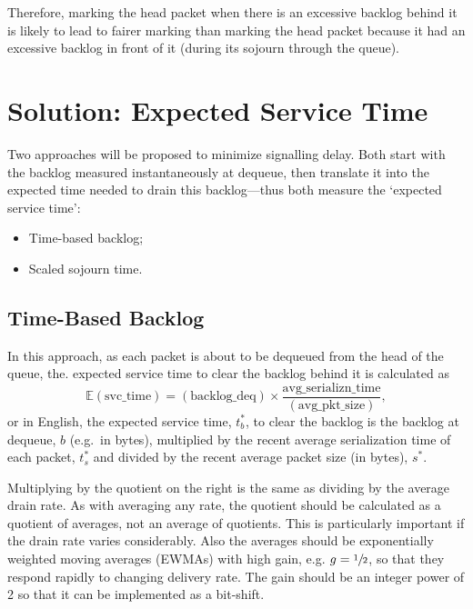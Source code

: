 Therefore, marking the head packet when there is an excessive backlog behind it is likely to lead to fairer marking than marking the head packet because it had an excessive backlog in front of it (during its sojourn through the queue). 

\section{Solution: Expected Service Time}\label{sec:exp_svc_time}

Two approaches will be proposed to minimize signalling delay. Both start with the backlog measured instantaneously at dequeue, then translate it into the expected time needed to drain this backlog---thus both measure the `expected service time':
\begin{itemize}[nosep]
	\item Time-based backlog;
	\item Scaled sojourn time.
\end{itemize}

\subsection{Time-Based Backlog}\label{sec:time-based_backlog}

In this approach, as each packet is about to be dequeued from the head of the queue, the. expected service time to clear the backlog behind it is calculated as
\[\mathbb{E}(\mathrm{svc\_time}) = \mathrm{(backlog\_deq)}\times \frac{\mathrm{avg\_serializn\_time}}{\mathrm{(avg\_pkt\_size)}},\]
or in English, the expected service time, \(t_b^*\), to clear the backlog is the backlog at dequeue, \(b\) (e.g.\ in bytes), multiplied by the recent average serialization time of each packet, \(t_s^*\) and divided by the recent average packet size (in bytes), \(s^*\).

Multiplying by the quotient on the right is the same as dividing by the average drain rate. As with averaging any rate, the quotient should be calculated as a quotient of averages, not an average of quotients. This is particularly important if the drain rate varies considerably. Also the averages should be exponentially weighted moving averages (EWMAs) with high gain, e.g. \(g=\sfrac{1}{2}\), so that they respond rapidly to changing delivery rate. The gain should be an integer power of 2 so that it can be implemented as a bit-shift.

